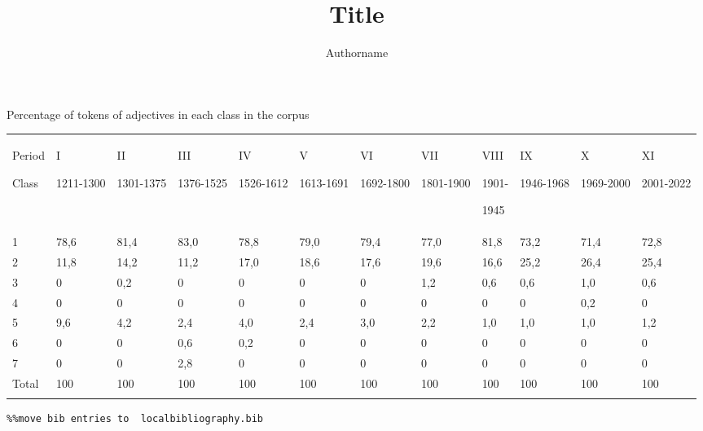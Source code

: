 \documentclass[output=paper]{langscibook}
\author{Authorname\orcid{}\affiliation{}}
\title{Title}
\begin{document}
\maketitle 


 Percentage of tokens of adjectives in each class in the corpus


\begin{tabularx}{\textwidth}{XXXXXXXXXXXX}

\lsptoprule

{\raggedleft Period}

Class & I

1211-1300 & II

1301-1375 & III

1376-1525 & IV

1526-1612 & V

1613-1691 & VI

1692-1800 & VII

1801-1900 & VIII

1901-

1945 & IX

1946-1968 & X

1969-2000 & XI

2001-2022\\
1 & 78,6 & 81,4 & 83,0 & 78,8 & 79,0 & 79,4 & 77,0 & 81,8 & 73,2 & 71,4 & 72,8\\
2 & 11,8 & 14,2 & 11,2 & 17,0 & 18,6 & 17,6 & 19,6 & 16,6 & 25,2 & 26,4 & 25,4\\
3 & 0 & 0,2 & 0 & 0 & 0 & 0 & 1,2 & 0,6 & 0,6 & 1,0 & 0,6\\
4 & 0 & 0 & 0 & 0 & 0 & 0 & 0 & 0 & 0 & 0,2 & 0\\
5 & 9,6 & 4,2 & 2,4 & 4,0 & 2,4 & 3,0 & 2,2 & 1,0 & 1,0 & 1,0 & 1,2\\
6 & 0 & 0 & 0,6 & 0,2 & 0 & 0 & 0 & 0 & 0 & 0 & 0\\
7 & 0 & 0 & 2,8 & 0 & 0 & 0 & 0 & 0 & 0 & 0 & 0\\
Total & 100 & 100 & 100 & 100 & 100 & 100 & 100 & 100 & 100 & 100 & 100\\
\lspbottomrule
\end{tabularx}

\begin{verbatim}%%move bib entries to  localbibliography.bib
\end{verbatim}
\sloppy\printbibliography[heading=subbibliography,notkeyword=this]
\end{document}
